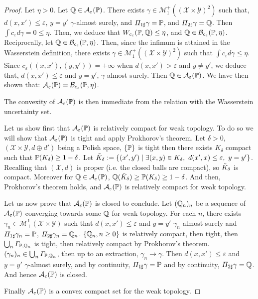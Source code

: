 \begin{proof}
Let $\eta>0$. Let $\mathbb{Q}\in\mathcal{A}_\varepsilon(\mathbb{P})$. There exists $\gamma\in
\mathcal{M}^+_1\left((\mathcal{X}\times\mathcal{Y})^2\right)$ such that, $d(x,x')\leq\varepsilon$, $y=y'$ $\gamma$-almost surely, and $\Pi_{1\sharp}\gamma=\mathbb{P}$, and $\Pi_{2\sharp}\gamma=\mathbb{Q}$. Then $\int c_\varepsilon d \gamma = 0\leq \eta$. Then, we deduce that $W_{c_\varepsilon}(\mathbb{P},\mathbb{Q})\leq \eta$, and $\mathbb{Q}\in\mathcal{B}_{c_\varepsilon}(\mathbb{P},\eta)$. Reciprocally, let $\mathbb{Q}\in\mathcal{B}_{c_\varepsilon}(\mathbb{P},\eta)$. Then, since the infimum is attained in the Wasserstein definition, there exists $\gamma\in
\mathcal{M}^+_1\left((\mathcal{X}\times\mathcal{Y})^2\right)$ such that $\int c_\varepsilon d \gamma \leq \eta$. Since $c_\varepsilon((x,x'),(y,y'))=+\infty$ when $d(x,x')>\varepsilon$ and $y\neq y'$, we deduce that, $d(x,x')\leq\varepsilon$ and $y=y'$, $\gamma$-almost surely. Then $\mathbb{Q}\in\mathcal{A}_\varepsilon(\mathbb{P})$. We have then shown that: $\mathcal{A}_\varepsilon(\mathbb{P})=\mathcal{B}_{c_\varepsilon}(\mathbb{P},\eta)$.

The convexity of $\mathcal{A}_\varepsilon(\mathbb{P})$ is then immediate from the relation with the Wasserstein uncertainty set.

Let us show first that $\mathcal{A}_\varepsilon(\mathbb{P})$ is relatively compact for weak topology. To do so we will show that $\mathcal{A}_\varepsilon(\mathbb{P})$ is tight and apply Prokhorov's theorem. Let $\delta>0$, $(\mathcal{X}\times \mathcal{Y},d\oplus d')$ being a Polish space, $\{\mathbb{P}\}$ is tight then there exists $K_\delta$ compact such that $\mathbb{P}(K_\delta)\geq1-\delta$.
Let $\Tilde{K}_\delta:=\left\{(x',y')\mid \exists (x,y)\in K_\delta,~ d(x',x)\leq\varepsilon,~y=y'\right\}$.  Recalling that $(\mathcal{X},d)$ is proper (i.e. the closed balls are compact), so $\Tilde{K}_\delta$ is compact. Moreover for $\mathbb{Q}\in\mathcal{A}_\varepsilon(\mathbb{P})$, $\mathbb{Q}(\Tilde{K}_\delta)\geq \mathbb{P}(K_\delta)\geq 1-\delta$. And then, Prokhorov's theorem holds, and $\mathcal{A}_\varepsilon(\mathbb{P})$ is relatively compact for weak topology.

Let us now prove that $\mathcal{A}_\varepsilon(\mathbb{P})$ is closed to conclude.  Let $(\mathbb{Q}_n)_n$ be a sequence of $\mathcal{A}_\varepsilon(\mathbb{P})$ converging towards some $\mathbb{Q}$ for weak topology. For each $n$, there exists $\gamma_n\in \mathcal{M}^1_+(\mathcal{X}\times\mathcal{Y})$ such that $d(x,x')\leq\varepsilon$ and $y=y'$ $\gamma_n$-almost surely and $\Pi_{1\sharp}\gamma_n=\mathbb{P}$, $\Pi_{2\sharp}\gamma_n=\mathbb{Q}_n$. $\{\mathbb{Q}_n,n\geq0\}$ is relatively compact, then tight, then $\bigcup_n \Gamma_{\mathbb{P},\mathbb{Q}_n}$ is tight, then relatively compact by Prokhorov's theorem. $(\gamma_n)_n\in\bigcup_n \Gamma_{\mathbb{P},\mathbb{Q}_n}$, then up to an extraction,  $\gamma_n\to\gamma$. Then $d(x,x')\leq\varepsilon$ and $y=y'$ $\gamma$-almost surely, and by continuity, $\Pi_{1\sharp}\gamma=\mathbb{P}$ and by continuity, $\Pi_{2\sharp}\gamma=\mathbb{Q}$. And hence $\mathcal{A}_\varepsilon(\mathbb{P})$ is closed.

Finally $\mathcal{A}_\varepsilon(\mathbb{P})$ is a convex compact set for the weak topology. 
\end{proof}




